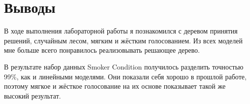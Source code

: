 \section{Выводы}
В ходе выполнения лабораторной работы я познакомился с деревом принятия решений, случайным лесом, мягким и жёстким голосованием. Из всех моделей мне больше всего понравилось реализовывать решающее дерево.

В результате набор данных Smoker Condition получилось разделить точностью 99\%, как и линейными моделями. Они показали себя хорошо в прошлой работе, поэтому мягкое и жёсткое голосование на их основе показывает такой же высокий результат.
\pagebreak
